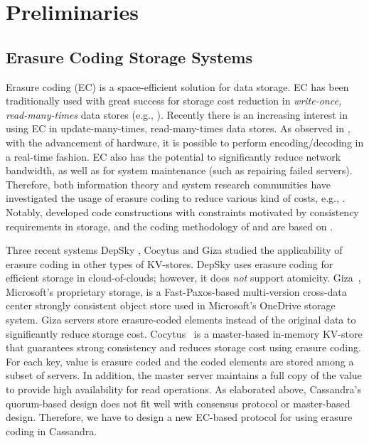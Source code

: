 \section{Preliminaries}

\subsection{Erasure Coding Storage Systems}
Erasure coding (EC) is a space-efficient solution for data storage. 
EC has been traditionally used with great success for storage cost reduction in \textit{write-once, read-many-times} data stores (e.g., \cite{rashmi_fast15, sathiamoorthy, HuaSimXu_etal_azure, DepSky13}). Recently there is an increasing interest in using EC in update-many-times, read-many-times data stores. As observed in \cite{Cocytus2016,GIZA2017}, with the advancement of hardware, it is possible to perform encoding/decoding in a real-time fashion.
EC also has the potential to significantly reduce network bandwidth, as well as for system maintenance (such as repairing failed servers).
Therefore, both information theory and system research communities have investigated the usage of erasure coding to reduce various kind of costs, e.g., \cite{rashmi2016ec, tamo2014family}. Notably, \cite{wang2018multi} developed code constructions with constraints motivated by consistency requirements in storage, and the coding methodology of \treasmod{} and \oreas{} are based on  \cite{wang2018multi}. 

Three recent systems DepSky \cite{DepSky13}, Cocytus \cite{Cocytus2016} and Giza \cite{GIZA2017} studied the applicability of erasure coding in other types of KV-stores. DepSky \cite{DepSky13} uses erasure coding for efficient storage in cloud-of-clouds; however, it does \textit{not} support atomicity.
Giza~\cite{GIZA2017}, Microsoft's proprietary storage,  is a Fast-Paxos-based  multi-version cross-data center strongly consistent object store used in Microsoft's OneDrive storage system. Giza servers store erasure-coded elements instead of the original data to significantly reduce storage cost. 
Cocytus~\cite{Cocytus2016} is a master-based in-memory KV-store that guarantees strong consistency and reduces storage cost using erasure coding.  For each key,  value is erasure coded and the coded elements are stored among a subset of servers. In addition, the master server maintains a full copy of the value to provide high availability for read operations. 
As elaborated above, Cassandra's quorum-based design does not fit well with consensus protocol or master-based design.
Therefore, we have to design a new EC-based protocol for using erasure coding in Cassandra.

